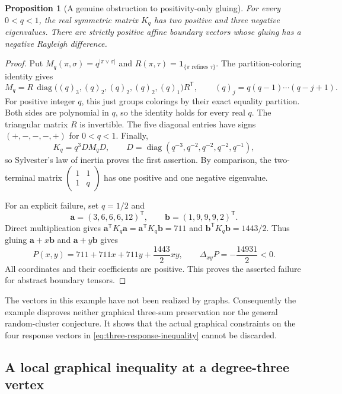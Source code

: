 \documentclass[11pt,a4paper]{article}
\newtheorem{proposition}[theorem]{Proposition}
\theoremstyle{definition}
\theoremstyle{remark}\newtheorem{remark}[theorem]{Remark}
\begin{document}
\begin{proposition}[A genuine obstruction to positivity-only gluing]
\label{prop:three-obstruction}
For every $0<q<1$, the real symmetric matrix $K_q$ has two positive
and three negative eigenvalues. There are strictly positive affine
boundary vectors whose gluing has a negative Rayleigh difference.
\end{proposition}
\begin{proof}
Put $M_q(\pi,\sigma)=q^{|\pi\vee\sigma|}$ and
$R(\pi,\tau)=\mathbf1_{\{\pi\text{ refines }\tau\}}$.
The partition-coloring identity gives
\[
 M_q=R\,\operatorname{diag}\bigl((q)_3,(q)_2,(q)_2,(q)_2,(q)_1\bigr)
 R^{\mathsf T},
 \qquad (q)_j=q(q-1)\cdots(q-j+1).
\]
For positive integer $q$, this just groups colorings by their exact
equality partition. Both sides are polynomial in $q$, so the identity
holds for every real $q$. The triangular matrix $R$ is invertible.
The five diagonal entries have signs $(+,-,-,-,+)$ for $0<q<1$.
Finally,
\[
 K_q=q^3D M_qD,\qquad
 D=\operatorname{diag}(q^{-3},q^{-2},q^{-2},q^{-2},q^{-1}),
\]
so Sylvester's law of inertia proves the first assertion.
By comparison, the two-terminal matrix
$\left(\begin{smallmatrix}1&1\\1&q\end{smallmatrix}\right)$
has one positive and one negative eigenvalue.

For an explicit failure, set $q=1/2$ and
\[
 \boldsymbol a=(3,6,6,6,12)^{\mathsf T},\qquad
 \boldsymbol b=(1,9,9,9,2)^{\mathsf T}.
\]
Direct multiplication gives
$\boldsymbol a^{\mathsf T}K_q\boldsymbol a
=\boldsymbol a^{\mathsf T}K_q\boldsymbol b=711$ and
$\boldsymbol b^{\mathsf T}K_q\boldsymbol b=1443/2$.
Thus gluing $\boldsymbol a+x\boldsymbol b$ and
$\boldsymbol a+y\boldsymbol b$ gives
\[
 P(x,y)=711+711x+711y+\frac{1443}{2}xy,\qquad
 \Delta_{xy}P=-\frac{14931}{2}<0.
\]
All coordinates and their coefficients are positive. This proves
the asserted failure for abstract boundary tensors.
\end{proof}

The vectors in this example have not been realized by graphs.
Consequently the example disproves neither graphical three-sum
preservation nor the general random-cluster conjecture.
It shows that the actual graphical constraints on the four response
vectors in \eqref{eq:three-response-inequality} cannot be discarded.

\subsection{A local graphical inequality at a degree-three vertex}
\end{document}
